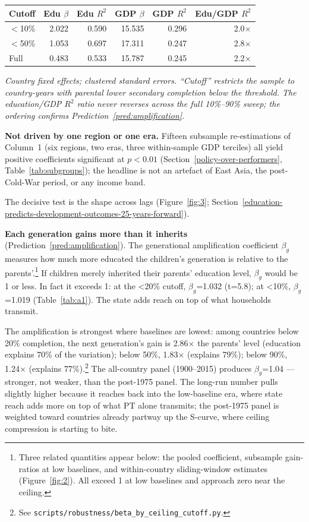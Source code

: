 \documentclass[12pt,letterpaper]{article}
\begin{document}
\begin{longtable}[]{@{}lrrrrr@{}}
\toprule
Cutoff & Edu $\beta$ & Edu $R^2$ & GDP $\beta$ & GDP $R^2$ & Edu/GDP $R^2$ \\
\midrule
\endhead
$<$10\%  & 2.022 & 0.590 & 15.535 & 0.296 & 2.0$\times$ \\
$<$50\%  & 1.053 & 0.697 & 17.311 & 0.247 & 2.8$\times$ \\
Full     & 0.483 & 0.533 & 15.787 & 0.245 & 2.2$\times$ \\
\bottomrule
\end{longtable}

\emph{Country fixed effects; clustered standard errors. ``Cutoff''
restricts the sample to country-years with parental lower secondary
completion below the threshold. The education/GDP $R^2$ ratio never
reverses across the full 10\%--90\% sweep; the ordering confirms
Prediction~\ref{pred:amplification}.}

\textbf{Not driven by one region or one era.} Fifteen subsample re-estimations of Column~1 (six regions, two eras, three within-sample GDP terciles) all yield positive coefficients significant at $p<0.01$ (Section~\ref{policy-over-performers}, Table~\ref{tab:subgroups}); the headline is not an artefact of East Asia, the post-Cold-War period, or any income band.

The decisive test is the shape across lags (Figure~\ref{fig:3}; Section~\ref{education-predicts-development-outcomes-25-years-forward}).

\textbf{Each generation gains more than it inherits}
(Prediction~\ref{pred:amplification}). The generational amplification
coefficient $\beta_g$ measures how much more educated the children's
generation is relative to the parents'.\footnote{Three related quantities appear below: the pooled coefficient, subsample gain-ratios at low baselines, and within-country sliding-window estimates (Figure~\ref{fig:2}). All exceed 1 at low baselines and approach zero near the ceiling.} If children merely inherited
their parents' education level, $\beta_g$ would be 1 or less. In fact it
exceeds 1: at the \textless{}20\% cutoff, $\beta_g$=1.032 (t=5.8);
at \textless{}10\%, $\beta_g$=1.019 (Table~\ref{tab:a1}). The state adds reach
on top of what households transmit.

The amplification is strongest where baselines are lowest: among
countries below 20\% completion, the next generation's gain is 2.86×
the parents' level (education explains 70\% of the variation); below
50\%, 1.83× (explains 79\%); below 90\%, 1.24× (explains
77\%).\footnote{See \texttt{scripts/robustness/beta\_by\_ceiling\_cutoff.py}.}
The all-country panel (1900--2015) produces $\beta_g$=1.04 --- stronger,
not weaker, than the post-1975 panel. The long-run number pulls slightly
higher because it reaches back into the low-baseline era, where state
reach adds more on top of what PT alone transmits; the post-1975 panel
is weighted toward countries already partway up the S-curve, where
ceiling compression is starting to bite.
\end{document}
